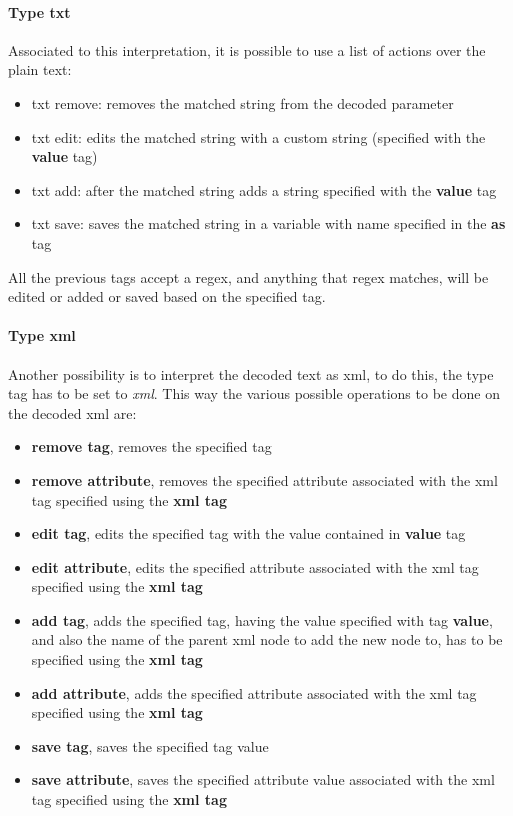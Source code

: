 \paragraph{Type txt}
Associated to this interpretation, it is possible to use a list of actions over the plain text:
\begin{itemize}
    \item txt remove: removes the matched string from the decoded parameter
    \item txt edit: edits the matched string with a custom string (specified with the \textbf{value} tag)
    \item txt add: after the matched string adds a string specified with the \textbf{value} tag
    \item txt save: saves the matched string in a variable with name specified in the \textbf{as} tag
\end{itemize}
All the previous tags accept a regex, and anything that regex matches, will be edited or added or saved based on the specified tag.

\paragraph{Type xml}
Another possibility is to interpret the decoded text as xml, to do this, the type tag has to be set to \textit{xml}.
This way the various possible operations to be done on the decoded xml are:
\begin{itemize}
    \item \textbf{remove tag}, removes the specified tag
    \item \textbf{remove attribute}, removes the specified attribute associated with the xml tag specified using the \textbf{xml tag}
    \item \textbf{edit tag}, edits the specified tag with the value contained in \textbf{value} tag 
    \item \textbf{edit attribute}, edits the specified attribute associated with the xml tag specified using the \textbf{xml tag}
    \item \textbf{add tag}, adds the specified tag, having the value specified with tag \textbf{value}, and also the name of the parent xml node to add the new node to, has to be specified using the \textbf{xml tag}
    \item \textbf{add attribute}, adds the specified attribute associated with the xml tag specified using the \textbf{xml tag}
    \item \textbf{save tag}, saves the specified tag value
    \item \textbf{save attribute}, saves the specified attribute value associated with the xml tag specified using the \textbf{xml tag}
\end{itemize}

